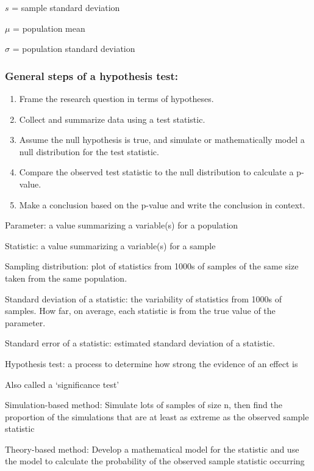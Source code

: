 \documentclass[
]{report}
\newcommand{\rgi}{\hspace{24pt}}  %
\begin{document}
\(s\) = sample standard deviation

\(\mu\) = population mean

\(\sigma\) = population standard deviation

\hypertarget{general-steps-of-a-hypothesis-test-2}{%
\subsubsection*{General steps of a hypothesis test:}\label{general-steps-of-a-hypothesis-test-2}}

\begin{enumerate}
\def\labelenumi{\arabic{enumi}.}
\item
  Frame the research question in terms of hypotheses.
\item
  Collect and summarize data using a test statistic.
\item
  Assume the null hypothesis is true, and simulate or mathematically model a null distribution for the test statistic.
\item
  Compare the observed test statistic to the null distribution to calculate a p-value.
\item
  Make a conclusion based on the p-value and write the conclusion in context.
\end{enumerate}

Parameter: a value summarizing a variable(s) for a population

Statistic: a value summarizing a variable(s) for a sample

Sampling distribution: plot of statistics from 1000s of samples of the same size taken from the same population.

Standard deviation of a statistic: the variability of statistics from 1000s of samples. How far, on average, each statistic is from the true value of the parameter.

Standard error of a statistic: estimated standard deviation of a statistic.

Hypothesis test: a process to determine how strong the evidence of an effect is

\rgi Also called a `significance test'

Simulation-based method: Simulate lots of samples of size n, then find the proportion of the simulations that are at least as extreme as the observed sample statistic

Theory-based method: Develop a mathematical model for the statistic and use the model to calculate the probability of the observed sample statistic occurring
\end{document}
